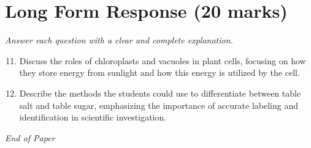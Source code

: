 \documentclass[12pt]{article}
\begin{document}
\section*{Long Form Response (20 marks)}
\textit{Answer each question with a clear and complete explanation.}
\begin{enumerate}[label=\arabic*.]
\setcounter{enumi}{10}
\item Discuss the roles of chloroplasts and vacuoles in plant cells, focusing on how they store energy from sunlight and how this energy is utilized by the cell.
\item Describe the methods the students could use to differentiate between table salt and table sugar, emphasizing the importance of accurate labeling and identification in scientific investigation.
\end{enumerate}

\vfill
\noindent\textit{End of Paper}
\end{document}
